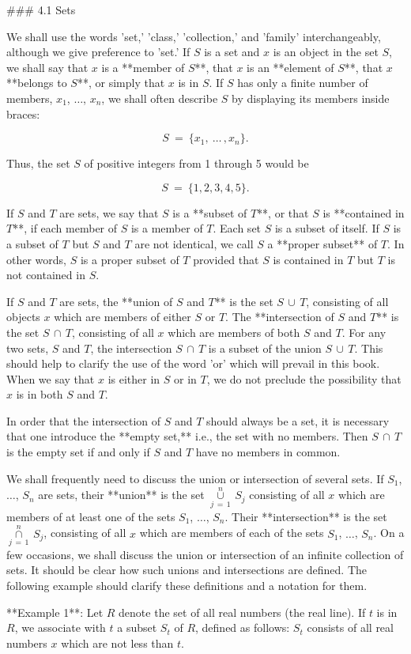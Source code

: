 

### 4.1 Sets

We shall use the words 'set,' 'class,' 'collection,' and 'family' interchangeably, although we give preference to 'set.' If \(S\) is a set and \(x\) is an object in the set \(S\), we shall say that \(x\) is a **member of \(S\)**, that \(x\) is an **element of \(S\)**, that \(x\)**belongs to \(S\)**, or simply that \(x\) is in \(S\). If \(S\) has only a finite number of members, \(x_{1}\), \(\ldots\), \(x_{n}\), we shall often describe \(S\) by displaying its members inside braces:

\[S\ =\ \{x_{1},\ \ldots\,,x_{n}\}.\]

Thus, the set \(S\) of positive integers from 1 through 5 would be

\[S\ =\ \{1,2,3,4,5\}.\]

If \(S\) and \(T\) are sets, we say that \(S\) is a **subset of \(T\)**, or that \(S\) is **contained in \(T\)**, if each member of \(S\) is a member of \(T\). Each set \(S\) is a subset of itself. If \(S\) is a subset of \(T\) but \(S\) and \(T\) are not identical, we call \(S\) a **proper subset** of \(T\). In other words, \(S\) is a proper subset of \(T\) provided that \(S\) is contained in \(T\) but \(T\) is not contained in \(S\).

If \(S\) and \(T\) are sets, the **union of \(S\) and \(T\)** is the set \(S\,\cup\,T\), consisting of all objects \(x\) which are members of either \(S\) or \(T\). The **intersection of \(S\) and \(T\)** is the set \(S\,\cap\,T\), consisting of all \(x\) which are members of both \(S\) and \(T\). For any two sets, \(S\) and \(T\), the intersection \(S\,\cap\,T\) is a subset of the union \(S\,\cup\,T\). This should help to clarify the use of the word 'or' which will prevail in this book. When we say that \(x\) is either in \(S\) or in \(T\), we do not preclude the possibility that \(x\) is in both \(S\) and \(T\).

In order that the intersection of \(S\) and \(T\) should always be a set, it is necessary that one introduce the **empty set,** i.e., the set with no members. Then \(S\,\cap\,T\) is the empty set if and only if \(S\) and \(T\) have no members in common.

We shall frequently need to discuss the union or intersection of several sets. If \(S_{1}\), \(\ldots\), \(S_{n}\) are sets, their **union** is the set \(\mathop{\cup}\limits_{j\,=\,1}^{n}\,S_{j}\) consisting of all \(x\) which are members of at least one of the sets \(S_{1}\), \(\ldots\), \(S_{n}\). Their **intersection** is the set \(\mathop{\cap}\limits_{j\,=\,1}^{n}\,S_{j}\), consisting of all \(x\) which are members of each of the sets \(S_{1}\), \(\ldots\), \(S_{n}\). On a few occasions, we shall discuss the union or intersection of an infinite collection of sets. It should be clear how such unions and intersections are defined. The following example should clarify these definitions and a notation for them.

**Example 1**: Let \(R\) denote the set of all real numbers (the real line). If \(t\) is in \(R\), we associate with \(t\) a subset \(S_{t}\) of \(R\), defined as follows: \(S_{t}\) consists of all real numbers \(x\) which are not less than \(t\).

